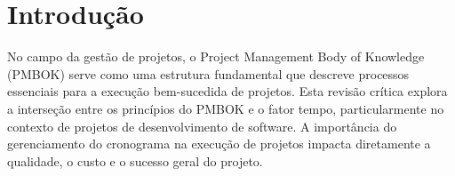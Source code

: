 \documentclass[
	12pt,				%
	oneside,			%
	a4paper,			%
	english,			%
	brazil				%
	]{abntex2unama}
\begin{document}
\frenchspacing


%
% 
%
\imprimircapa

\tableofcontents*
\cleardoublepage



\textual



% 
%
%
\chapter{Introdução}

No campo da gestão de projetos, o Project Management Body of Knowledge (PMBOK) serve como uma estrutura fundamental que descreve processos essenciais para a execução bem-sucedida de projetos. Esta revisão crítica explora a interseção entre os princípios do PMBOK e o fator tempo, particularmente no contexto de projetos de desenvolvimento de software. A importância do gerenciamento do cronograma na execução de projetos impacta diretamente a qualidade, o custo e o sucesso geral do projeto.
\end{document}
